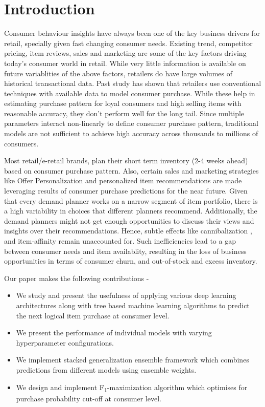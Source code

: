 \section{Introduction}
Consumer behaviour insights have always been one of the key business drivers for retail, specially given
fast changing consumer needs. Existing trend, competitor pricing, item reviews, sales and marketing are some of the 
key factors driving today's consumer world in retail. While very little information is available
on future variablities of the above factors, retailers do have large volumes of historical transactional data. Past study 
\cite{choudhury2019machine} has shown that retailers use conventional techniques with available data to model consumer purchase. 
While these help in estimating purchase pattern for loyal consumers and high selling items with reasonable accuracy, they 
don't perform well for the long tail. Since multiple parameters interact non-linearly to define consumer purchase pattern,
traditional models are not sufficient to achieve high accuracy across thousands to millions of consumers.

Most retail/e-retail brands, plan their short term inventory (2-4 weeks ahead)  based on consumer 
purchase pattern. Also, certain sales and marketing strategies like Offer Personalization and personalized item
recommendations are made leveraging results of consumer purchase predictions for the near future.
Given that every demand planner works on a narrow segment of item portfolio, there is a high 
variability in choices that different planners recommend. Additionally, the demand planners might not get enough opportunities 
to discuss their views and insights over their recommendations. Hence, subtle effects like cannibalization
\cite{shah2007retailer}, and item-affinity remain unaccounted for. Such inefficiencies lead to a gap between consumer needs 
and item availablity, resulting in the loss of business opportunities in terms of consumer churn, and out-of-stock
and excess inventory.

Our paper makes the following contributions -
\begin{itemize}
\item We study and present the usefulness of applying various deep learning architectures along with tree based machine 
learning algorithms to predict the next logical item purchase at consumer level.
\item We present the performance of individual models with varying hyperparameter configurations.
\item We implement stacked generalization ensemble framework \cite{wolpert1992stacked} 
which combines predictions from different models using ensemble weights.
\item We design and implement F\textsubscript{1}-maximization algorithm which optimises for purchase probability cut-off 
at consumer level.
\end{itemize}
